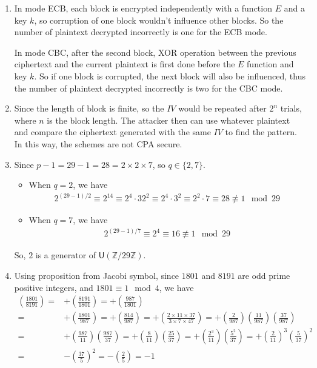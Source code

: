 \documentclass[11pt,a4paper]{article}
\begin{document}
\begin{enumerate}
\item In mode ECB, each block is encrypted independently with a function $E$ and a key $k$, so corruption of one block wouldn't influence other blocks. So the number of plaintext decrypted incorrectly is one for the ECB mode.
\par In mode CBC, after the second block, XOR operation between the previous ciphertext and the current plaintext is first done before the $E$ function and key $k$. So if one block is corrupted, the next block will also be influenced, thus the number of plaintext decrypted incorrectly is two for the CBC mode.

\item Since the length of block is finite, so the $IV$ would be repeated after $2^{n}$ trials, where $n$ is the block length. The attacker then can use whatever plaintext and compare the ciphertext generated with the same $IV$ to find the pattern. In this way, the schemes are not CPA secure.

\item Since $p-1 = 29-1 = 28 = 2\times2\times7$, so $q\in\{2, 7\}$.
	\begin{itemize}
	\item When $q=2$, we have
	\begin{align*}
		2^{(29-1)/2} \equiv 2^{14} \equiv 2^{4}\cdot32^{2} \equiv 2^{4}\cdot3^{2} \equiv 2^{2}\cdot7 \equiv 28 \not\equiv 1 \mod 29
	\end{align*}
	
	\item When $q=7$, we have
	\begin{align*}
		2^{(29-1)/7} \equiv 2^{4} \equiv 16 \not\equiv 1 \mod 29
	\end{align*}
	\end{itemize}
\par So, $2$ is a generator of $\mathsf{U}(\mathbb{Z}/29\mathbb{Z})$.

\item Using proposition from Jacobi symbol, since $1801$ and $8191$ are odd prime positive integers, and $1801 \equiv 1 \mod 4$, we have
\begin{align*}
	\left(\frac{1801}{8191}\right) =& + \left(\frac{8191}{1801}\right) = + \left(\frac{987}{1801}\right) \\
	=& + \left(\frac{1801}{987}\right) = + \left(\frac{814}{987}\right) = + \left(\frac{2\times11\times37}{3\times7\times47}\right) = + \left(\frac{2}{987}\right)\left(\frac{11}{987}\right)\left(\frac{37}{987}\right) \\
	=& + \left(\frac{987}{11}\right)\left(\frac{987}{37}\right) = + \left(\frac{8}{11}\right)\left(\frac{25}{37}\right) = + \left(\frac{2^{3}}{11}\right)\left(\frac{5^{2}}{37}\right) = + \left(\frac{2}{11}\right)^{3}\left(\frac{5}{37}\right)^{2} \\
	=& - \left(\frac{37}{5}\right)^{2} = - \left(\frac{2}{5}\right) = -1
\end{align*}


\end{enumerate}
\end{document}

